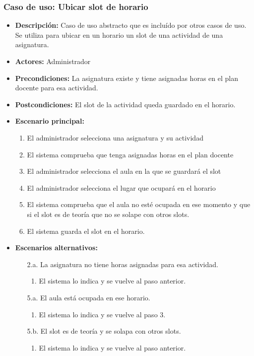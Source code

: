 \documentclass{book}
\begin{document}
\subsubsection*{Caso de uso: Ubicar slot de horario}
\label{guardar_slot}
\begin{itemize}
\item{\bf Descripción:} Caso de uso abstracto que es incluído por otros casos de uso. Se utiliza para ubicar en un horario un slot de una actividad de una asignatura.
\item{\bf Actores:} Administrador
\item{\bf Precondiciones:} La asignatura existe y tiene asignadas horas en el plan docente para esa actividad.
\item{\bf Postcondiciones:} El slot de la actividad queda guardado en el horario.
\item{\bf Escenario principal:}
	\begin{enumerate}
	\item El administrador selecciona una asignatura y su actividad
	\item El sistema comprueba que tenga asignadas horas en el plan docente
	\item El administrador selecciona el aula en la que se guardará el slot
	\item El administrador selecciona el lugar que ocupará en el horario
	\item El sistema comprueba que el aula no esté ocupada en ese momento y que si el slot es de teoría que no se solape con otros slots.
	\item El sistema guarda el slot en el horario.
	\end{enumerate}
\item{\bf Escenarios alternativos:}
	\begin{itemize}
		\item[2.a.] La asignatura no tiene horas asignadas para esa actividad.
		\begin{enumerate}
			\item El sistema lo indica y se vuelve al paso anterior.
		\end{enumerate}
		\item[5.a.] El aula está ocupada en ese horario.
		\begin{enumerate}
			\item El sistema lo indica y se vuelve al paso 3.
		\end{enumerate}
		\item[5.b.] El slot es de teoría y se solapa con otros slots.
		\begin{enumerate}
			\item El sistema lo indica y se vuelve al paso anterior.
		\end{enumerate}
	\end{itemize}
\end{itemize}
\end{document}
